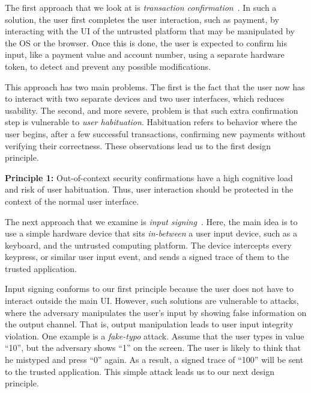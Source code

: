The first approach that we look at is \emph{transaction confirmation}~\cite{filyanov2011uni}. In such a solution, the user first completes the user interaction, such as payment, by interacting with the UI of the untrusted platform that may be manipulated by the OS or the browser. Once this is done, the user is expected to confirm his input, like a payment value and account number, using a separate hardware token, to detect and prevent any possible modifications.

This approach has two main problems. The first is the fact that the user now has to interact with two separate devices and two user interfaces, which reduces usability. The second, and more severe, problem is that such extra confirmation step is vulnerable to \emph{user habituation}. Habituation refers to behavior where the user begins, after a few successful transactions, confirming new payments without verifying their correctness. These observations lead us to the first design principle.  

\begin{tcolorbox}
\textbf{Principle 1:} Out-of-context security confirmations have a high cognitive load and risk of user habituation. Thus, user interaction should be protected in the context of the normal user interface.
\end{tcolorbox}

The next approach that we examine is \emph{input signing}~\cite{IntegriKey}. Here, the main idea is to use a simple hardware device that sits \emph{in-between} a user input device, such as a keyboard, and the untrusted computing platform. The device intercepts every keypress, or similar user input event, and sends a signed trace of them to the trusted application. %

Input signing conforms to our first principle because the user does not have to interact outside the main UI. However, such solutions are vulnerable to attacks, where the adversary manipulates the user's input by showing false information on the output channel. That is, output manipulation leads to user input integrity violation. One example is a \emph{fake-typo} attack. Assume that the user types in value ``10'', but the adversary shows ``1'' on the screen. The user is likely to think that he mistyped and press ``0'' again. As a result, a signed trace of ``100'' will be sent to the trusted application. This simple attack leads us to our next design principle.

